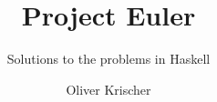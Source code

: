 \documentclass{scrreprt}
\numberwithin{equation}{chapter}
\begin{document}
\title{Project Euler}
\author{Oliver Krischer}
\subtitle{Solutions to the problems in Haskell}
\maketitle
\tableofcontents





\end{document}
